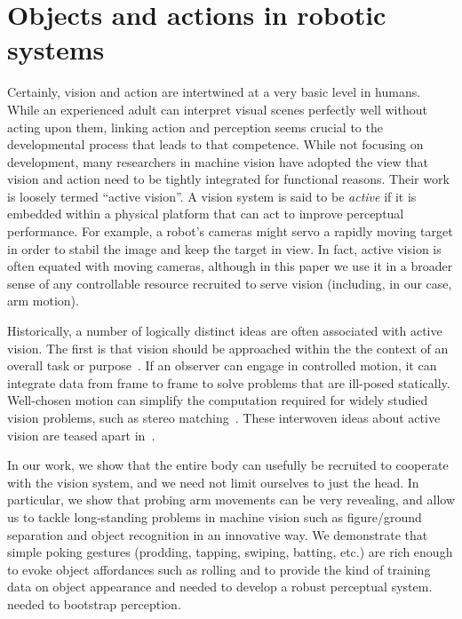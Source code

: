 \section{Objects and actions in robotic systems}

Certainly, vision and action are intertwined at a very basic level in
humans.  While an experienced adult can interpret visual scenes
perfectly well without acting upon them, linking action and perception
seems crucial to the developmental process that leads to that
competence.  While not focusing on development, many researchers in
machine vision have adopted the view that vision and action need to be
tightly integrated for functional reasons.  Their work is loosely
termed ``active vision''.
%
A vision system is said to be {\em active} if it is embedded within a
physical platform that can act to improve perceptual performance.  For
example, a robot's cameras might servo a rapidly moving target in order to
stabil\ize{} the image and keep the target in view.  In fact, active
vision is often equated with moving cameras, although in this paper we
use it in a broader sense of any controllable resource recruited to
serve vision (including, in our case, arm motion).

Historically, a number of logically distinct ideas are often
associated with active vision.  The first is that vision should be
approached within the the context of an overall task or
purpose~\cite{aloimonos87active}.  If an observer can engage in
controlled motion, it can integrate data from frame to frame to solve
problems that are ill-posed statically.  Well-chosen motion can
simplify the computation required for widely studied vision problems,
such as stereo matching~\cite{bajcsy88active,ballard91animate}.  These
interwoven ideas about active vision are teased apart
in~\cite{tarr94computational}.  

In our work, we show that the entire body can usefully be recruited to
cooperate with the vision system, and we need not limit ourselves to
just the head.  In particular, we show that probing arm movements
can be very revealing, and allow us to tackle long-standing problems 
in machine vision 
\ifrevised
such as figure/ground separation and object recognition
\fi
in an innovative way.
We demonstrate that simple poking gestures
(prodding, tapping, swiping, batting, etc.) are rich enough 
to evoke object affordances such as rolling and to provide
the kind of training data 
\ifrevised
on object appearance and \ahhbehavior{}
needed to develop a robust perceptual system.
\else
needed to bootstrap perception.
\fi

